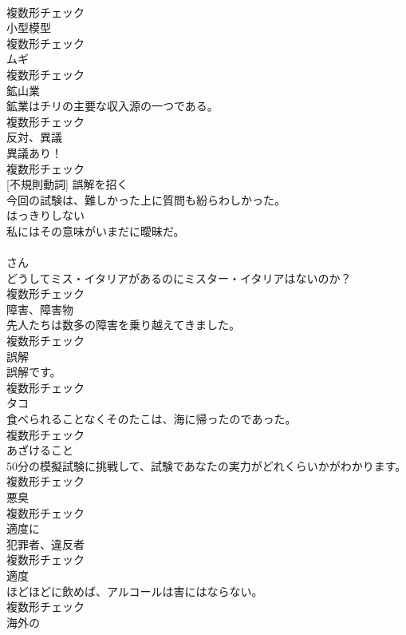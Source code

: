 \documentclass[8pt]{extreport}
\begin{document}
\begin{CJK}{UTF8}{min}
\\	複数形チェック
\\	[名詞]	小型模型	
\\	複数形チェック
\\	[名詞]	ムギ	
\\	複数形チェック
\\	[名詞]	鉱山業	
\\	鉱業はチリの主要な収入源の一つである。	
\\	複数形チェック
\\	[名詞]	反対、異議	
\\	異議あり！	
\\	複数形チェック
\\	[動詞] [不規則動詞]	誤解を招く	
\\	今回の試験は、難しかった上に質問も紛らわしかった。	
\\	[形容詞]	はっきりしない	
\\	私にはその意味がいまだに曖昧だ。	
\\	[名詞]	
\\	さん	
\\	どうしてミス・イタリアがあるのにミスター・イタリアはないのか？	
\\	複数形チェック
\\	[名詞]	障害、障害物	
\\	先人たちは数多の障害を乗り越えてきました。	
\\	複数形チェック
\\	[名詞]	誤解	
\\	誤解です。	
\\	複数形チェック
\\	[名詞]	タコ	
\\	食べられることなくそのたこは、海に帰ったのであった。	
\\	複数形チェック
\\	[名詞]	あざけること	
\\	50分の模擬試験に挑戦して、試験であなたの実力がどれくらいかがわかります。	
\\	複数形チェック
\\	[名詞]	悪臭	
\\	複数形チェック
\\	[副詞]	適度に	
\\	[名詞]	犯罪者、違反者	
\\	複数形チェック
\\	[名詞]	適度	
\\	ほどほどに飲めば、アルコールは害にはならない。	
\\	複数形チェック
\\	[形容詞]	海外の	

\end{CJK}
\end{document}
